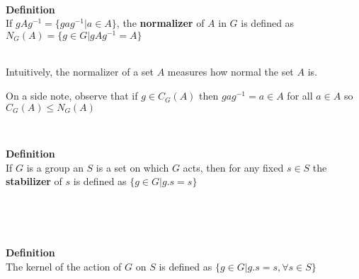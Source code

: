 \documentclass[titlepage, 12pt]{article}
\newenvironment{definition}[1][Definition]
    {\leavevmode \\ \begin{mdframed}[backgroundcolor=gray!20] \textbf{#1} \\}
    {  \end{mdframed}\leavevmode \\}
\begin{document}
\begin{definition}
    If $gAg^{-1} = \{gag^{-1}| a\in A\}$, the \textbf{normalizer}  of $A$ in
    $G$ is defined as $N_G(A) = \{g\in G| gAg^{-1} = A \}$
\end{definition}
Intuitively, the normalizer of a set $A$ measures how normal the set $A$ is.


On a side note, observe that if $g\in C_G(A)$ then $gag^{-1} = a\in A$ for all
$a\in A$ so $C_G(A)\le N_G(A)$

\begin{definition}
    If $G$ is a group an $S$ is a set on which $G$ acts, then for any fixed
    $s\in S$ the \textbf{stabilizer} of $s$ is defined as $\{g\in G| g.s=s\}$
\end{definition}

\begin{definition}
    The kernel of the action of $G$ on $S$ is defined as $\{g\in G| g.s = s,
    \forall s\in S\}$
\end{definition}
\end{document}

